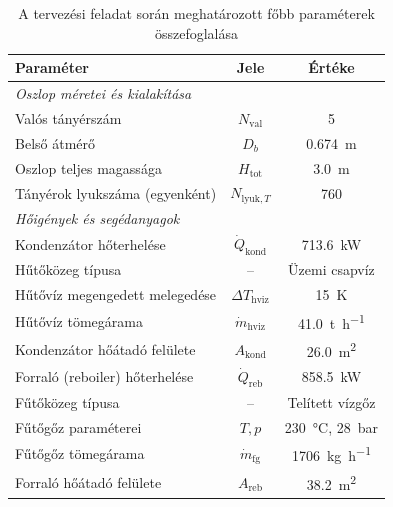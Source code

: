 \begin{table}[htbp]
  \centering
  \caption{A tervezési feladat során meghatározott főbb paraméterek összefoglalása}
  \begin{tabular}{lcc}
    \toprule
    \textbf{Paraméter} & \textbf{Jele} & \textbf{Értéke} \\
    \midrule
    \multicolumn{3}{l}{\textit{Oszlop méretei és kialakítása}} \\
    Valós tányérszám & $N_{\text{val}}$ & \num{5} \\
    Belső átmérő & $D_b$ & \qty{0.674}{\metre} \\
    Oszlop teljes magassága & $H_{\text{tot}}$ & \qty{3.0}{\metre} \\
    Tányérok lyukszáma (egyenként) & $N_{\text{lyuk}, T}$ & \num{760} \\
    \midrule
    \multicolumn{3}{l}{\textit{Hőigények és segédanyagok}} \\
    Kondenzátor hőterhelése & $\dot{Q}_{\text{kond}}$ & \qty{713.6}{\kilo\watt} \\
    Hűtőközeg típusa & -- & Üzemi csapvíz \\
    Hűtővíz megengedett melegedése & $\Delta T_{\text{hviz}}$ & \qty{15}{\kelvin} \\
    Hűtővíz tömegárama & $\dot{m}_{\text{hviz}}$ & \qty{41.0}{\tonne\per\hour} \\
    Kondenzátor hőátadó felülete & $A_{\text{kond}}$ & \qty{26.0}{\metre\squared} \\
    Forraló (reboiler) hőterhelése & $\dot{Q}_{\text{reb}}$ & \qty{858.5}{\kilo\watt} \\
    Fűtőközeg típusa & -- & Telített vízgőz \\
    Fűtőgőz paraméterei & $T, p$ & \qty{230}{\celsius}, \qty{28}{\bar} \\
    Fűtőgőz tömegárama & $\dot{m}_{\text{fg}}$ & \qty{1706}{\kg\per\hour} \\
    Forraló hőátadó felülete & $A_{\text{reb}}$ & \qty{38.2}{\metre\squared} \\
    \bottomrule
  \end{tabular}
\end{table}

\newpage
